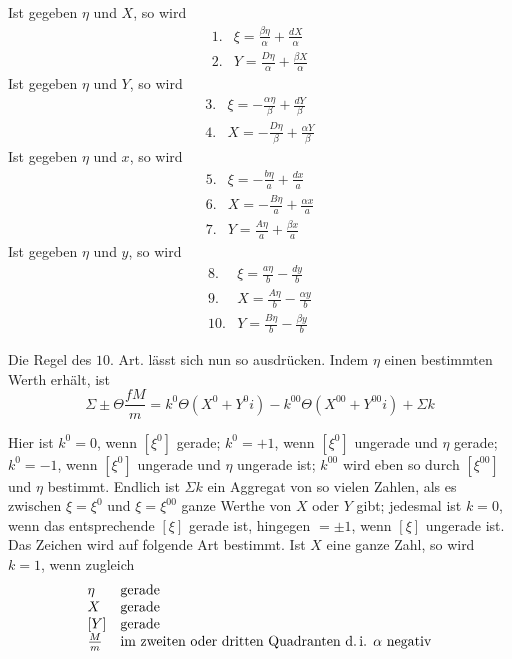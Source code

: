 Ist gegeben $\eta$ und $X$, so wird
\[
\begin{array}{rl}
1.&\xi=\frac{\beta\eta}{\alpha}+\frac{dX}{\alpha}\\[3pt]
2.&Y=\frac{D\eta}{\alpha}+\frac{\beta X}{\alpha}
\end{array}
\]
Ist gegeben $\eta$ und $Y$, so wird
\[
\begin{array}{rl}
3.&\xi=-\frac{\alpha\eta}{\beta}+\frac{dY}{\beta}\\[3pt]
4.&X=-\frac{D\eta}{\beta}+\frac{\alpha Y}{\beta}
\end{array}
\]
Ist gegeben $\eta$ und $x$, so wird
\[
\begin{array}{rl}
5.&\xi=-\frac{b\eta}{a}+\frac{dx}{a}\\[3pt]
6.&X=-\frac{B\eta}{a}+\frac{\alpha x}{a}\\[3pt]
7.&Y=\frac{A\eta}{a}+\frac{\beta x}{a}
\end{array}
\]
Ist gegeben $\eta$ und $y$, so wird
\[
\begin{array}{rl}
8.&\xi=\frac{a\eta}{b}-\frac{dy}{b}\\[3pt]
9.&X=\frac{A\eta}{b}-\frac{\alpha y}{b}\\[3pt]
10.&Y=\frac{B\eta}{b}-\frac{\beta y}{b}
\end{array}
\]

Die Regel des $10$. Art. lässt sich nun so ausdrücken. Indem $\eta$ einen bestimmten Werth erhält, ist
\[
\Sigma\pm\Theta\frac{fM}{m}=k^0\Theta(X^0+Y^0i)-k^{00}\Theta(X^{00}+Y^{00}i)+\Sigma k
\]

Hier ist $k^0=0$, wenn $[\xi^0]$ gerade; $k^0=+1$, wenn $[\xi^0]$ ungerade und $\eta$ gerade; $k^0=-1$, wenn $[\xi^0]$ ungerade und $\eta$ ungerade ist; $k^{00}$ wird eben so durch $[\xi^{00}]$ und $\eta$ bestimmt. Endlich ist $\Sigma k$ ein Aggregat von so vielen Zahlen, als es zwischen $\xi=\xi^0$ und $\xi=\xi^{00}$ ganze Werthe von $X$ oder $Y$ gibt; jedesmal ist $k=0$, wenn das entsprechende $[\xi]$ gerade ist, hingegen $=\pm1$, wenn $[\xi]$ ungerade ist. Das Zeichen wird auf folgende Art bestimmt. Ist $X$ eine ganze Zahl, so wird $k=1$, wenn zugleich
\[
\begin{array}{ll}
\eta&\text{gerade}\\
X&\text{gerade}\\
\relax[Y]&\text{gerade}\\
\frac{M}{m}&\text{im zweiten oder dritten Quadranten d.\,i. }\alpha\text{ negativ}
\end{array}
\]

